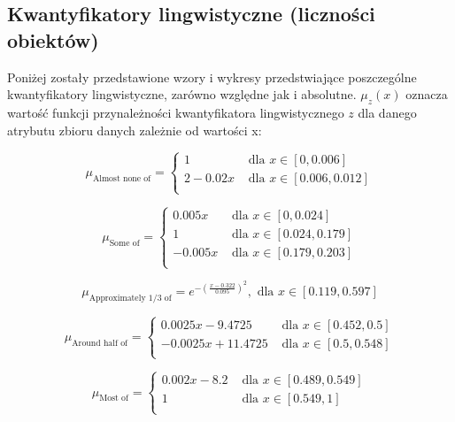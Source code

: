 \documentclass{classrep}
\begin{document}
\subsection{Kwantyfikatory lingwistyczne (liczności obiektów)}

Poniżej zostały przedstawione wzory i wykresy przedstwiające poszczególne kwantyfikatory lingwistyczne, zarówno względne jak i absolutne. 
\( \mu_z(x) \) oznacza wartość funkcji przynależności kwantyfikatora lingwistycznego \(z\) dla danego atrybutu zbioru danych zależnie od wartości x:

 \begin{equation}
    \mu_{\text{Almost none of}} = 
    \begin{cases}
        1 & \text{ dla } x \in [0,0.006] \\
        2 - 0.02x & \text{ dla } x \in [0.006,0.012] \\
      \end{cases}
  \end{equation}

  \begin{equation}
    \mu_{\text{Some of}} =
      \begin{cases}
        0.005x & \text{ dla } x \in [0,0.024] \\
        1 & \text{ dla } x \in [0.024,0.179] \\
        -0.005x & \text{ dla } x \in [0.179,0.203] \\
      \end{cases}  
  \end{equation}
  
  \begin{equation}
    \mu_{\text{Approximately 1/3 of}} = e^{-(\frac{x-0.322}{0.095})^2}, \text{ dla } x \in [0.119,0.597]
  \end{equation}

   \begin{equation}
    \mu_{\text{Around half of}} =
      \begin{cases}
        0.0025x - 9.4725 & \text{ dla } x \in [0.452,0.5] \\
        -0.0025x + 11.4725 & \text{ dla } x \in [0.5,0.548] \\
      \end{cases}  
  \end{equation}
  
  \begin{equation}
    \mu_{\text{Most of}} =
      \begin{cases}
        0.002x - 8.2 & \text{ dla } x \in [0.489,0.549] \\
        1 & \text{ dla } x \in [0.549,1] \\
      \end{cases}  
  \end{equation}
  
\end{document}
